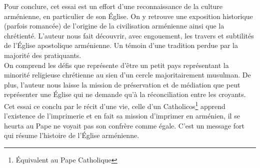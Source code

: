 \documentclass[11pt, a4paper]{report}
\begin{document}
    Pour conclure, cet essai est un effort d'une reconnaissance de la culture arménienne, en particulier de son Église.
    On y retrouve une exposition historique (parfois romancée) de l'origine de la civilisation arménienne ainsi que la chrétienté.
    L'auteur nous fait découvrir, avec engouement, les travers et subtilités de l'Église apostolique arménienne.
    Un témoin d'une tradition perdue par la majorité des pratiquants.\\
    On comprend les défis que représente d'être un petit pays représentant la minorité religieuse chrétienne au sien d'un cercle majoritairement musulman. 
    De plus, l'auteur nous laisse la mission de préservation et de médiation que peut représenter une Église qui ne demande 
    qu'à la réconciliation entre les croyants. Cet essai ce conclu par le récit d'une vie, celle d'un Catholicos\footnote{Équivalent au Pape Catholique}  
    apprend l'existence de l'imprimerie et en fait sa mission d'imprimer en arménien, il se heurta au Pape ne voyait pas son confrère comme égale. 
    C'est un message fort qui résume l'histoire de l'Église arménienne.
    \pagebreak
    \printbibliography
\end{document}
